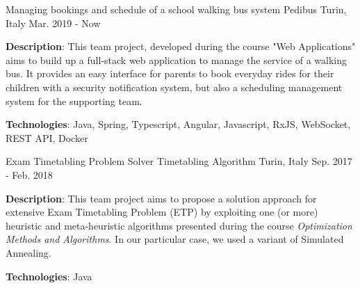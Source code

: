{\begin{cventries}
  \cventry
  {Managing bookings and schedule of a school walking bus system} %
  {Pedibus} %
  {Turin, Italy} %
  {Mar. 2019 - Now} %
  {
   \begin{cvitems} %
     \item {\textbf{Description}: This team project, developed during the course "Web Applications" aims to build up a full-stack web application to manage the service of a walking bus. It provides an easy interface for parents to book everyday rides for their children with a security notification system, but also a scheduling management system for the supporting team.}
      \item {\textbf{Technologies}: Java, Spring, Typescript, Angular, Javascript, RxJS, WebSocket, REST API, Docker}
   \end{cvitems}
  }

  \cventry
    {Exam Timetabling Problem Solver} %
    {Timetabling Algorithm} %
    {Turin, Italy} %
    {Sep. 2017 - Feb. 2018} %
    {
      \begin{cvitems} %
        \item {\textbf{Description}: This team project aims to propose a solution approach for extensive Exam Timetabling Problem (ETP) by exploiting one (or more) heuristic and meta-heuristic algorithms presented during the course \textit{Optimization Methods and Algorithms}. In our particular case, we used a variant of Simulated Annealing.}
        \item {\textbf{Technologies}: Java}
      \end{cvitems}
    }
\end{cventries}
}
